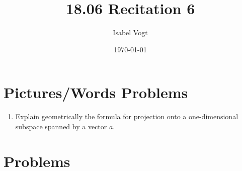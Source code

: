 \documentclass[11pt]{article}
\title{18.06 Recitation 6}
\author{Isabel Vogt}
\date{\today}                                           %
\begin{document}
\maketitle
\section{Pictures/Words Problems}

\begin{enumerate}

\item Explain geometrically the formula for projection onto a one-dimensional subspace spanned by a vector $a$.

\end{enumerate}

\section{Problems}
\end{document}
